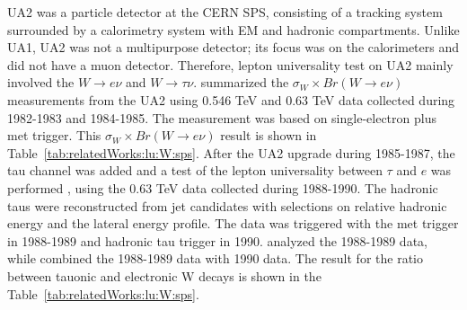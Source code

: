 UA2 was a particle detector at the CERN SPS, consisting of a tracking system surrounded by a calorimetry system with EM and hadronic compartments. Unlike UA1, UA2 was not a multipurpose detector; its focus was on the calorimeters and did not have a muon detector. Therefore, lepton universality test on UA2 mainly involved the $W \to e\nu$ and $W \to \tau \nu$. \cite{appel1986measurement} summarized the $\sigma_W \times Br(W\to e \nu) $ measurements from the UA2 using 0.546 TeV and 0.63 TeV data collected during 1982-1983 and 1984-1985. The measurement was based on single-electron plus met trigger. This  $\sigma_W \times Br(W\to e \nu) $ result is shown in Table~\ref{tab:relatedWorks:lu:W:sps}. After the UA2 upgrade during 1985-1987,  the tau channel was added and a test of the lepton universality between $\tau$ and $e$ was performed \cite{Alitti:1991eh, Alitti:1992hv}, using the 0.63 TeV data collected during 1988-1990. The hadronic taus were reconstructed from jet candidates with selections on relative hadronic energy and the lateral energy profile. The data was triggered with the met trigger in 1988-1989 and hadronic tau trigger in 1990. \cite{Alitti:1991eh} analyzed the 1988-1989 data, while \cite{Alitti:1992hv} combined the 1988-1989 data with 1990 data. The result \cite{Alitti:1992hv} for the ratio between tauonic and electronic W decays is shown in the Table~\ref{tab:relatedWorks:lu:W:sps}. 






